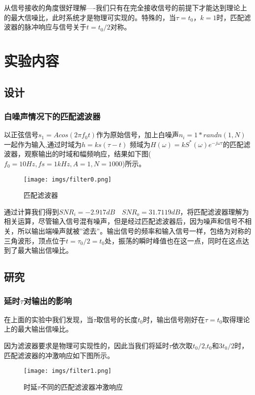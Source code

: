 \documentclass[a4paper]{article}
\begin{document}
从信号接收的角度很好理解----我们只有在完全接收信号的前提下才能达到理论上的最大信噪比，此时系统才是物理可实现的。特殊的，当$\tau = t_{0}，k=1$时，匹配滤波器的脉冲响应与信号关于$t=t_0/2$对称。


\section{实验内容}
\subsection{设计}
\subsubsection{白噪声情况下的匹配滤波器}
以正弦信号$s_1=Acos(2\pi f_0t)$作为原始信号，加上白噪声$n_i=1*randn(1,N)$一起作为输入,通过时域为$h=ks(\tau-t)$  频域为${H}(\omega ) = k{S^ * }(\omega ){e^{ - j\omega {\tau}}}$的匹配滤波器，观察输出的时域和幅频响应，结果如下图($f_0=10Hz,fs=1kHz,A=1,N=1000$)所示。
\newpage


\begin{figure}[htbp]
\centering
\texttt{[image: imgs/filter0.png]}
\caption{匹配滤波器}
\end{figure}

通过计算我们得到$SNR_i=-2.917dB\quad SNR_o=31.7119dB$，将匹配滤波器理解为相关运算，尽管输入信号混有噪声，但是经过匹配滤波器后，因为噪声和信号不相关，所以输出端噪声就被''滤去''。输出信号的频率和输入信号一样，包络为对称的三角波形，顶点位于\(t=\tau_0/2=t_0\)处，振荡的瞬时峰值也在这一点，同时在这点达到了最大输出信噪比。



\subsection{研究}
\subsubsection{延时$\tau$对输出的影响}
在上面的实验中我们发现，当\(\tau \)取信号的长度$t_0$时，输出信号刚好在$\tau=t_0$取得理论上的最大输出信噪比。

因为滤波器要求是物理可实现性的，因此当我们将延时\(\tau \)依次取$t_0/2$,$t_0$和$3t_0/2$时，匹配滤波器的冲激响应如下图所示。

\begin{figure}[htbp]
\centering
\texttt{[image: imgs/filter1.png]}
\caption{时延$\tau$不同的匹配滤波器冲激响应}
\end{figure}
\end{document}
